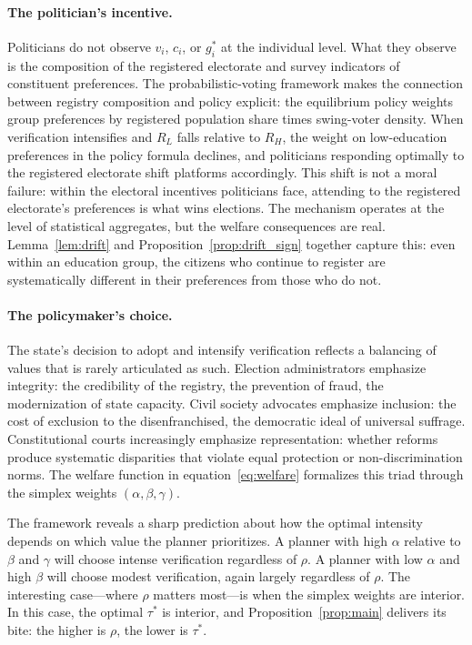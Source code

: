 \paragraph{The politician's incentive.} Politicians do not observe $v_i$, $c_i$, or $g_i^*$ at the individual level. What they observe is the composition of the registered electorate and survey indicators of constituent preferences. The probabilistic-voting framework makes the connection between registry composition and policy explicit: the equilibrium policy weights group preferences by registered population share times swing-voter density. When verification intensifies and $R_L$ falls relative to $R_H$, the weight on low-education preferences in the policy formula declines, and politicians responding optimally to the registered electorate shift platforms accordingly. This shift is not a moral failure: within the electoral incentives politicians face, attending to the registered electorate's preferences is what wins elections. The mechanism operates at the level of statistical aggregates, but the welfare consequences are real. Lemma~\ref{lem:drift} and Proposition~\ref{prop:drift_sign} together capture this: even within an education group, the citizens who continue to register are systematically different in their preferences from those who do not.

\paragraph{The policymaker's choice.} The state's decision to adopt and intensify verification reflects a balancing of values that is rarely articulated as such. Election administrators emphasize integrity: the credibility of the registry, the prevention of fraud, the modernization of state capacity. Civil society advocates emphasize inclusion: the cost of exclusion to the disenfranchised, the democratic ideal of universal suffrage. Constitutional courts increasingly emphasize representation: whether reforms produce systematic disparities that violate equal protection or non-discrimination norms. The welfare function in equation~\eqref{eq:welfare} formalizes this triad through the simplex weights $(\alpha, \beta, \gamma)$.

The framework reveals a sharp prediction about how the optimal intensity depends on which value the planner prioritizes. A planner with high $\alpha$ relative to $\beta$ and $\gamma$ will choose intense verification regardless of $\rho$. A planner with low $\alpha$ and high $\beta$ will choose modest verification, again largely regardless of $\rho$. The interesting case---where $\rho$ matters most---is when the simplex weights are interior. In this case, the optimal $\tau^*$ is interior, and Proposition~\ref{prop:main} delivers its bite: the higher is $\rho$, the lower is $\tau^*$.

